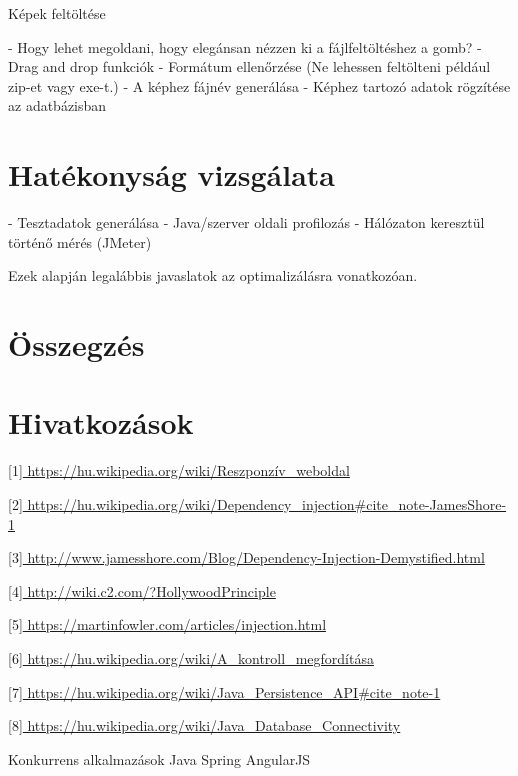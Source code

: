 \documentclass[11pt]{article}
\begin{document}
Képek feltöltése

- Hogy lehet megoldani, hogy elegánsan nézzen ki a fájlfeltöltéshez a gomb?
- Drag and drop funkciók
- Formátum ellenőrzése (Ne lehessen feltölteni például zip-et vagy exe-t.)
- A képhez fájnév generálása
- Képhez tartozó adatok rögzítése az adatbázisban

\section{Hatékonyság vizsgálata}


- Tesztadatok generálása
- Java/szerver oldali profilozás
- Hálózaton keresztül történő mérés (JMeter)

Ezek alapján legalábbis javaslatok az optimalizálásra vonatkozóan.

\section*{Összegzés}


\section*{Hivatkozások}

[1]\url{ https://hu.wikipedia.org/wiki/Reszponzív\_weboldal }

[2]\url{ https://hu.wikipedia.org/wiki/Dependency\_injection#cite_note-JamesShore-1 }	

[3]\url{ http://www.jamesshore.com/Blog/Dependency-Injection-Demystified.html }

[4]\url{ http://wiki.c2.com/?HollywoodPrinciple }

[5]\url{ https://martinfowler.com/articles/injection.html }

[6]\url{ https://hu.wikipedia.org/wiki/A_kontroll_megfordítása }

[7]\url{ https://hu.wikipedia.org/wiki/Java_Persistence_API#cite_note-1 }

[8]\url{ https://hu.wikipedia.org/wiki/Java_Database_Connectivity }


Konkurrens alkalmazások
Java Spring
AngularJS
\end{document}
